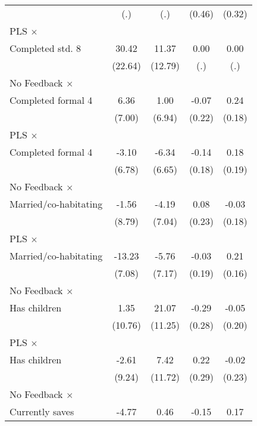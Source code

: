 \begin{table}[htbp]
\begin{tabular}{l*{4}{c}}
                &      (.)         &      (.)         &   (0.46)         &   (0.32)         \\
\addlinespace
PLS $\times$ \\ Completed std. 8&    30.42         &    11.37         &     0.00         &     0.00         \\
                &  (22.64)         &  (12.79)         &      (.)         &      (.)         \\
\addlinespace
No Feedback $\times$ \\ Completed formal 4&     6.36         &     1.00         &    -0.07         &     0.24         \\
                &   (7.00)         &   (6.94)         &   (0.22)         &   (0.18)         \\
\addlinespace
PLS $\times$ \\ Completed formal 4&    -3.10         &    -6.34         &    -0.14         &     0.18         \\
                &   (6.78)         &   (6.65)         &   (0.18)         &   (0.19)         \\
\addlinespace
No Feedback $\times$ \\ Married/co-habitating&    -1.56         &    -4.19         &     0.08         &    -0.03         \\
                &   (8.79)         &   (7.04)         &   (0.23)         &   (0.18)         \\
\addlinespace
PLS $\times$ \\ Married/co-habitating&   -13.23\sym{*}  &    -5.76         &    -0.03         &     0.21         \\
                &   (7.08)         &   (7.17)         &   (0.19)         &   (0.16)         \\
\addlinespace
No Feedback $\times$ \\ Has children&     1.35         &    21.07\sym{*}  &    -0.29         &    -0.05         \\
                &  (10.76)         &  (11.25)         &   (0.28)         &   (0.20)         \\
\addlinespace
PLS $\times$ \\ Has children&    -2.61         &     7.42         &     0.22         &    -0.02         \\
                &   (9.24)         &  (11.72)         &   (0.29)         &   (0.23)         \\
\addlinespace
No Feedback $\times$ \\ Currently saves&    -4.77         &     0.46         &    -0.15         &     0.17         \\

\end{tabular}
\end{table}
